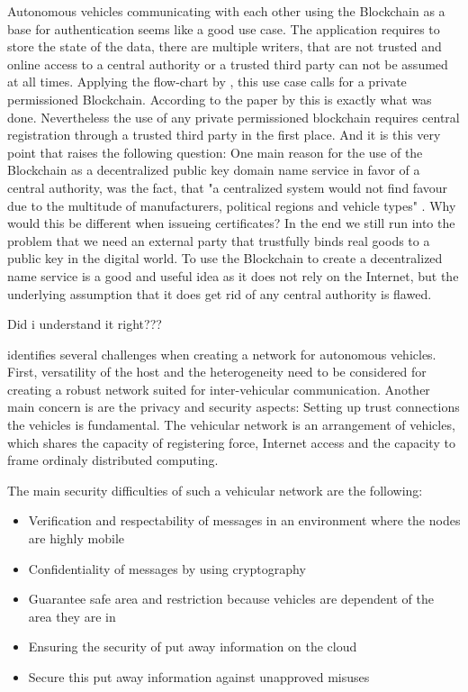 Autonomous vehicles communicating with each other using the Blockchain as a base for authentication seems like a good use case. The application requires to store the state of the data, there are multiple writers, that are not trusted and online access to a central authority or a trusted third party can not be assumed at all times. Applying the flow-chart by \citeauthor{Wust2017}, this use case calls for a private permissioned Blockchain. 
According to the paper by \citeauthor{Rowan2017} this is exactly what was done. 
Nevertheless the use of any private permissioned blockchain requires central registration through a trusted third party in the first place. And it is this very point that raises the following question: One main reason for the use of the Blockchain as a decentralized public key domain name service in favor of a central authority, was the fact, that "a centralized system would not find favour due to the multitude of manufacturers, political regions and vehicle types" \cite{Rowan2017}. Why would this be different when issueing certificates?
In the end we still run into the problem that we need an external party that trustfully binds real goods to a public key in the digital world. 
To use the Blockchain to create a decentralized name service is a good and useful idea as it does not rely on the Internet, but the underlying assumption that it does get rid of any central authority is flawed.

Did i understand it right???


\citeauthor{Sharma2017} identifies several challenges when creating a network for autonomous vehicles. First, versatility of the host and the heterogeneity need to be considered for creating a robust network suited for inter-vehicular communication. Another main concern is are the privacy and security aspects: Setting up trust connections the vehicles is fundamental. The vehicular network is an arrangement of vehicles, which shares the capacity of registering force, Internet access and the capacity to frame ordinaly distributed computing.

The main security difficulties of such a vehicular network are the following:
\begin{itemize}
	\item Verification and respectability of messages in an environment where the nodes are highly mobile
	\item Confidentiality of messages by using cryptography
	\item Guarantee safe area and restriction because vehicles are dependent of the area they are in
	\item Ensuring the security of put away information on the cloud
	\item Secure this put away information against unapproved misuses
\end{itemize}

